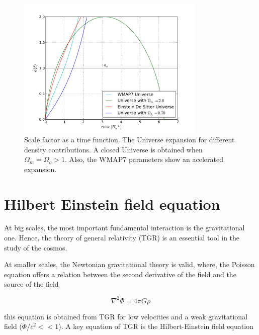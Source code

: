\begin{figure}[htbp]
       \centering
               \includegraphics[width=0.8\textwidth]{Images/chapter2/factordeescala.pdf}
       \caption{ \small Scale factor as a time function. The Universe expansion for 
       different density contributions. A closed Universe is obtained when 
       $\Omega_m = \Omega_o>1$. Also, the WMAP7 parameters show an acelerated expansion. 
        }
       \label{factor}
 \end{figure}

\section{Hilbert Einstein field equation}

At big scales, the most important fundamental interaction is the 
gravitational one. Hence, the theory of general relativity (TGR) is 
an essential tool in the study of the cosmos. 

At smaller scales, the Newtonian gravitational theory is valid, where, 
the Poisson equation offers a relation between the second derivative
of the field and the source of the field 

\[ \nabla^2\Phi=4\pi G\rho\]

this equation is obtained from TGR for low velocities and 
a weak gravitational field ($\Phi/c^2<< 1$). A key equation of TGR is
the Hilbert-Einstein field equation

